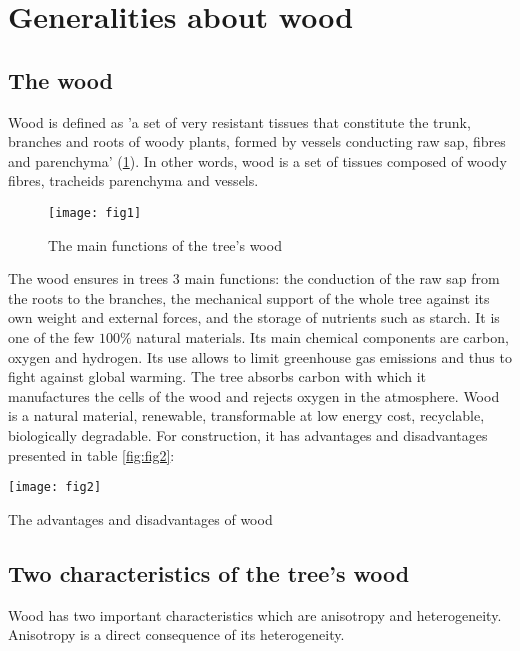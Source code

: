 \section{Generalities about wood}

\subsection{The wood}

Wood is defined as 'a set of very resistant tissues that constitute the trunk, branches and roots of woody plants, formed by vessels conducting raw sap, fibres and parenchyma' (\ref{fig:fig1}). In other words, wood is a set of tissues composed of woody fibres, tracheids parenchyma and vessels.

\graphicspath{{Images/}}
\begin{figure}[htp]
	\centering
	\texttt{[image: fig1]}
	\caption{The main functions of the tree's wood \cite{Reference1}}
	\label{fig:fig1}
\end{figure}

The wood ensures in trees 3 main functions: the conduction of the raw sap from the roots to the branches, the mechanical support of the whole tree against its own weight and external forces, and the storage of nutrients such as starch. It is one of the few $100 \%$ natural materials. Its main chemical components are carbon, oxygen and hydrogen. Its use allows to limit greenhouse gas emissions and thus to fight against global warming. The tree absorbs carbon with which it manufactures the cells of the wood and rejects oxygen in the atmosphere. Wood is a natural material, renewable, transformable at low energy cost, recyclable, biologically degradable. For construction, it has advantages and disadvantages presented in table \ref{fig:fig2}:

\graphicspath{{Images/}}
\begin{table}[htp]
	\centering
	\texttt{[image: fig2]}
	\caption{The advantages and disadvantages of wood}
	\label{fig:fig2}
\end{table}

\subsection{Two characteristics of the tree's wood}

Wood has two important characteristics which are anisotropy and heterogeneity. Anisotropy is a direct consequence of its heterogeneity.


